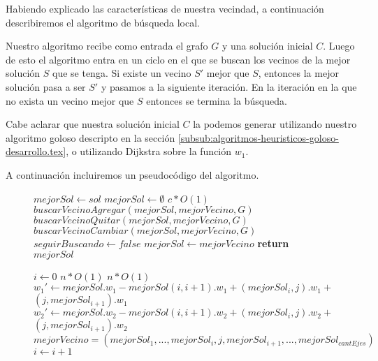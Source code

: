 Habiendo explicado las características de nuestra vecindad, a continuación describiremos el algoritmo de búsqueda local.

Nuestro algoritmo recibe como entrada el grafo $G$ y una solución inicial $C$. Luego de esto el algoritmo entra en un ciclo en el que se buscan los vecinos de la mejor solución $S$ que se tenga. Si existe un vecino $S'$ mejor que $S$, entonces la mejor solución pasa a ser $S'$ y pasamos a la siguiente iteración. En la iteración en la que no exista un vecino mejor que $S$ entonces se termina la búsqueda.

Cabe aclarar que nuestra solución inicial $C$ la podemos generar utilizando nuestro algoritmo goloso descripto en la sección \ref{subsub:algoritmos-heuristicos-goloso-desarrollo.tex}, o utilizando Dijkstra sobre la función $w_1$.

A continuación incluiremos un pseudocódigo del algoritmo.
\begin{center}
 \begin{figure}[H]
  \begin{pseudo}
   \State $mejorSol \leftarrow sol$
   \State $mejorSol \leftarrow \emptyset $
   \hfill$c*O(1)$
      \State $buscarVecinoAgregar(mejorSol, mejorVecino, G)$
      \State $buscarVecinoQuitar(mejorSol, mejorVecino, G)$
      \State $buscarVecinoCambiar(mejorSol, mejorVecino, G)$
	\State $seguirBuscando \leftarrow false$
      \Else
	\State $mejorSol \leftarrow mejorVecino$
      \EndIf
   \EndWhile
   \State \textbf{return} $mejorSol$
   \EndProcedure
  \end{pseudo}
 \end{figure}
\end{center}

\begin{flushleft}
 \begin{figure}[H]
  \begin{pseudo}
   \State $i \leftarrow 0$
   \hfill$n*O(1)$
      \hfill$n*O(1)$
	  \State $w_1' \leftarrow mejorSol.w_1 - mejorSol(i,i+1).w_1 + (mejorSol_i,j).w_1 + $
	  \State $(j,mejorSol_{i+1}).w_1$
	  \State $w_2' \leftarrow mejorSol.w_2 - mejorSol(i,i+1).w_2 + (mejorSol_i,j).w_2 + $
	  \State $(j,mejorSol_{i+1}).w_2$
	    \State $mejorVecino = (mejorSol_1, ... ,mejorSol_i, j, mejorSol_{i+1}, ..., mejorSol_{cantEjes})$
	  \EndIf
      \EndFor
      \State $i \leftarrow i+1$
   \EndWhile
   \EndProcedure
  \end{pseudo}
 \end{figure}
\end{flushleft}

